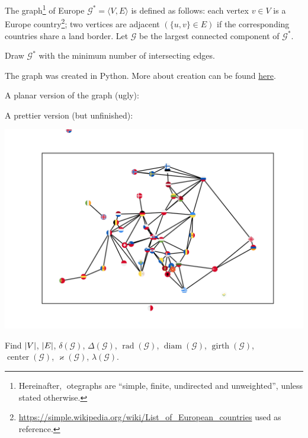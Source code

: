 \documentclass[a4paper,12pt]{article}
\newcommand{\graph}[1][G]{\mathcal{#1}}
\newcommand{\op}[1]{\operatorname*{#1}}
\newcommand{\minDegree}[1]{\delta(#1)}
\newcommand{\maxDegree}[1]{\Delta(#1)}
\newcommand{\graphRadius}[1]{\op{rad}(#1)}
\newcommand{\graphDiameter}[1]{\op{diam}(#1)}
\newcommand{\graphGirth}[1]{\op{girth}(#1)}
\newcommand{\graphCenter}[1]{\op{center}(#1)}
\newcommand{\vertexConnectivity}[1]{\varkappa(#1)}
\newcommand{\edgeConnectivity}[1]{\lambda(#1)}
\begin{document}
\begin{tasks}
    \item The graph\footnote{Hereinafter, \enquote{graphs} are \enquote{simple, finite, undirected and unweighted}, unless stated otherwise.} of Europe $\graph^{*} = \langle V, E\rangle$ is defined as follows: each vertex $v \in V$ is a Europe country\footnote{\url{https://simple.wikipedia.org/wiki/List_of_European_countries} used as reference.}; two vertices are adjacent $(\{u, v\} \in E)$ if the corresponding countries share a land border. Let $\graph$ be the largest connected component of $\graph^{*}$.
    
    \begin{subtasks}
        \item Draw $\graph^{*}$ with the minimum number of intersecting edges.
            
        The graph was created in Python. More about creation can be found \href{https://github.com/sltKaguya/itmo/blob/wip/discr_math/05_graph_theory/05_homework.ipynb}{here}.

        A planar version of the graph (ugly):
        
            \begingroup
            
            \endgroup
        \newpage
        A prettier version (but unfinished):

            \includegraphics{Eurograph}
        \item Find $\left|V\right|$, $\left|E\right|$, $\minDegree{\graph}$, $\maxDegree{\graph}$, $\graphRadius{\graph}$, $\graphDiameter{\graph}$, $\graphGirth{\graph}$, $\graphCenter{\graph}$, $\vertexConnectivity{\graph}$, $\edgeConnectivity{\graph}$.


\end{subtasks}
\end{tasks}
\end{document}
